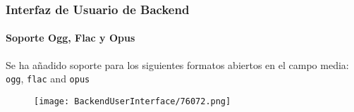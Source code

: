 \begin{frame}[fragile]
	\frametitle{Interfaz de Usuario de Backend}
	\framesubtitle{Soporte Ogg, Flac y Opus}

	Se ha añadido soporte para los siguientes formatos abiertos en el campo media:
	\texttt{ogg}, \texttt{flac} and \texttt{opus}

	\begin{figure}
		\texttt{[image: BackendUserInterface/76072.png]}
	\end{figure}

\end{frame}


